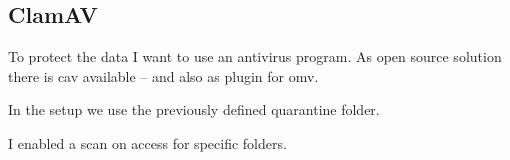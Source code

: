 

\subsection{ClamAV}\label{subsec:ClamAV}

To protect the data I want to use an antivirus program. As open source solution
there is \gls{cav} available -- and also as plugin for \gls{omv}.


In the setup we use the previously defined quarantine folder.


I enabled a scan on access for specific folders.


